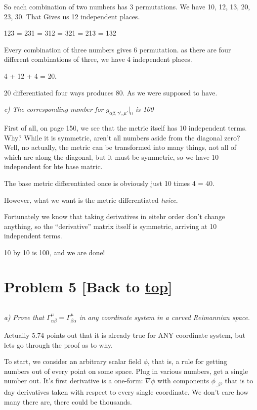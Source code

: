\documentclass[landscape,letterpaper,10pt,english]{article}
\begin{document}
So each combination of two numbers has 3 permutations. We have 10, 12,
13, 20, 23, 30. That Gives us 12 independent places.

123 = 231 = 312 = 321 = 213 = 132

Every combination of three numbers gives 6 permutation. as there are
four different combinations of three, we have 4 independent places.

4 + 12 + 4 = 20.

20 differentiated four ways produces 80. As we were supposed to have.

    \emph{c) The corresponding number for
\(g_{\alpha\beta,\gamma',\mu'}|_0\) is 100}

First of all, on page 150, we see that the metric itself has 10
independent terms. Why? While it is symmetric, aren't all numbers aside
from the diagonal zero? Well, no actually, the metric can be transformed
into many things, not all of which are along the diagonal, but it must
be symmetric, so we have 10 independent for hte base matric.

The base metric differentiated once is obviously just 10 times 4 = 40.

However, what we want is the metric differentiated \emph{twice}.

Fortunately we know that taking derivatives in eitehr order don't change
anything, so the ``derivative'' matrix itself is symmetric, arriving at
10 independent terms.

10 by 10 is 100, and we are done!

    \hypertarget{problem-5-back-to-top}{%
\section{\texorpdfstring{Problem 5 {[}Back to
\hyperref[toc]{top}{]}}{Problem 5 {[}Back to {]}}}\label{problem-5-back-to-top}}

\[\label{P5}\]

\emph{a) Prove that
\(\Gamma^\mu_{\alpha\beta} = \Gamma^\mu_{\beta\alpha}\) in any
coordinate system in a curved Reimannian space.}

    Actually 5.74 points out that it is already true for ANY coordinate
system, but lets go through the proof as to why.

To start, we consider an arbitrary scalar field \(\phi\), that is, a
rule for getting numbers out of every point on some space. Plug in
various numbers, get a single number out. It's first derivative is a
one-form: \(\nabla \phi\) with components \(\phi_{,\beta}\), that is to
day derivatives taken with respect to every single coordinate. We don't
care how many there are, there could be thousands.
\end{document}

